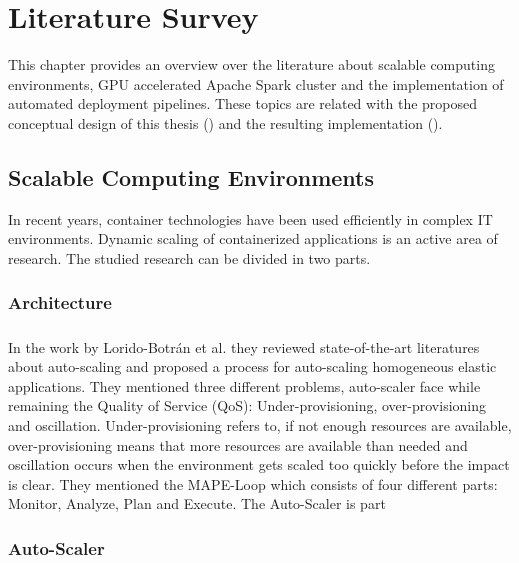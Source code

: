 \chapter{Literature Survey}
\label{chap:03_related-work}


This chapter provides an overview over the literature about scalable computing environments, GPU accelerated Apache Spark cluster and the implementation of automated deployment pipelines. These topics are related with the proposed conceptual design of this thesis () and the resulting implementation ().


\section{Scalable Computing Environments}
In recent years, container technologies have been used efficiently in complex IT environments. Dynamic scaling of containerized applications is an active area of research. The studied research can be divided in two parts. 


\subsection{Architecture}
\paragraph{} In the work by Lorido-Botrán et al.  they reviewed state-of-the-art literatures about auto-scaling and proposed a process for auto-scaling homogeneous elastic applications. They mentioned three different problems, auto-scaler face while remaining the Quality of Service (QoS): Under-provisioning, over-provisioning and oscillation. Under-provisioning refers to, if not enough resources are available, over-provisioning means that more resources are available than needed and oscillation occurs when the environment gets scaled too quickly before the impact is clear. They mentioned the MAPE-Loop which consists of four different parts: Monitor, Analyze, Plan and Execute.  The Auto-Scaler is part 


\subsection{Auto-Scaler}
